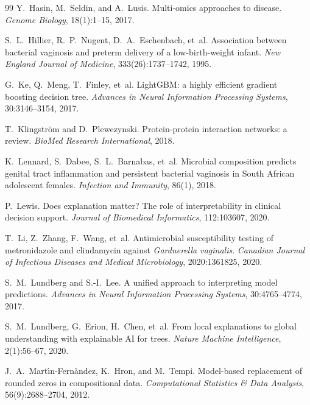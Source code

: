 \documentclass[12pt,a4paper]{report}
\begin{document}
\begin{thebibliography}{99}
Y.~Hasin, M.~Seldin, and A.~Lusis.
\newblock Multi-omics approaches to disease.
\newblock \textit{Genome Biology}, 18(1):1--15, 2017.

S.~L.~Hillier, R.~P.~Nugent, D.~A.~Eschenbach, et~al.
\newblock Association between bacterial vaginosis and preterm delivery of a low-birth-weight infant.
\newblock \textit{New England Journal of Medicine}, 333(26):1737--1742, 1995.

G.~Ke, Q.~Meng, T.~Finley, et~al.
\newblock LightGBM: a highly efficient gradient boosting decision tree.
\newblock \textit{Advances in Neural Information Processing Systems}, 30:3146--3154, 2017.

T.~Klingstr\"om and D.~Plewezynski.
\newblock Protein-protein interaction networks: a review.
\newblock \textit{BioMed Research International}, 2018.

K.~Lennard, S.~Dabee, S.~L.~Barnabas, et~al.
\newblock Microbial composition predicts genital tract inflammation and persistent bacterial vaginosis in South African adolescent females.
\newblock \textit{Infection and Immunity}, 86(1), 2018.

P.~Lewis.
\newblock Does explanation matter? The role of interpretability in clinical decision support.
\newblock \textit{Journal of Biomedical Informatics}, 112:103607, 2020.

T.~Li, Z.~Zhang, F.~Wang, et~al.
\newblock Antimicrobial susceptibility testing of metronidazole and clindamycin against \textit{Gardnerella vaginalis}.
\newblock \textit{Canadian Journal of Infectious Diseases and Medical Microbiology}, 2020:1361825, 2020.

S.~M.~Lundberg and S.-I.~Lee.
\newblock A unified approach to interpreting model predictions.
\newblock \textit{Advances in Neural Information Processing Systems}, 30:4765--4774, 2017.

S.~M.~Lundberg, G.~Erion, H.~Chen, et~al.
\newblock From local explanations to global understanding with explainable AI for trees.
\newblock \textit{Nature Machine Intelligence}, 2(1):56--67, 2020.

J.~A.~Mart\'\i n-Fern\`andez, K.~Hron, and M.~Tempi.
\newblock Model-based replacement of rounded zeros in compositional data.
\newblock \textit{Computational Statistics \& Data Analysis}, 56(9):2688--2704, 2012.


\end{thebibliography}
\end{document}
